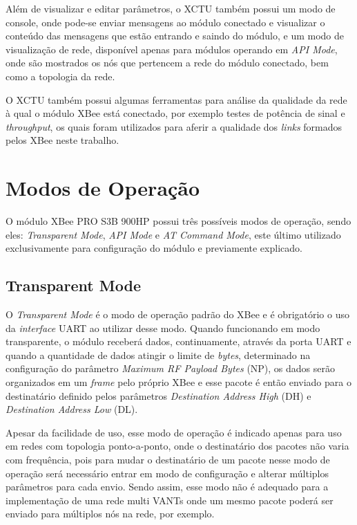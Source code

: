 Além de visualizar e editar parâmetros, o XCTU também possui um modo de console, onde pode-se enviar mensagens ao módulo conectado e visualizar o conteúdo das mensagens que estão entrando e saindo do módulo, e um modo de visualização de rede, disponível apenas para módulos operando em \emph{API Mode}, onde são mostrados os nós que pertencem a rede do módulo conectado, bem como a topologia da rede.

O XCTU também possui algumas ferramentas para análise da qualidade da rede à qual o módulo XBee está conectado, por exemplo testes de potência de sinal e \emph{throughput}, os quais foram utilizados para aferir a qualidade dos \emph{links} formados pelos XBee neste trabalho.

\section{Modos de Operação}

O módulo XBee PRO S3B 900HP possui três possíveis modos de operação, sendo eles: \emph{Transparent Mode}, \emph{API Mode} e \emph{AT Command Mode}, este último utilizado exclusivamente para configuração do módulo e previamente explicado.

\subsection{Transparent Mode}

O \emph{Transparent Mode} é o modo de operação padrão do XBee e é obrigatório o uso da \emph{interface} UART ao utilizar desse modo. Quando funcionando em modo transparente, o módulo receberá dados, continuamente, através da porta UART e quando a quantidade de dados atingir o limite de \emph{bytes}, determinado na configuração do parâmetro \emph{Maximum RF Payload Bytes} (NP), os dados serão organizados em um \emph{frame} pelo próprio XBee e esse pacote é então enviado para o destinatário definido pelos parâmetros \emph{Destination Address High} (DH) e \emph{Destination Address Low} (DL). 

Apesar da facilidade de uso, esse modo de operação é indicado apenas para uso em redes com topologia ponto-a-ponto, onde o destinatário dos pacotes não varia com frequência, pois para mudar o destinatário de um pacote nesse modo de operação será necessário entrar em modo de configuração e alterar múltiplos parâmetros para cada envio. Sendo assim, esse modo não é adequado para a implementação de uma rede multi VANTs onde um mesmo pacote poderá ser enviado para múltiplos nós na rede, por exemplo.


